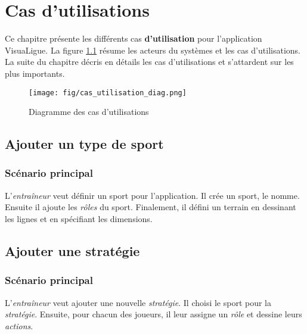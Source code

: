 
\chapter{Cas d'utilisations}
\label{s:cas_utilisation}

Ce chapitre présente les différents cas \textbf{d'utilisation} pour l'application VisuaLigue.
La figure \ref{fig:cas_utilisation_diag} résume les acteurs du systèmes et les cas d'utilisations.
La suite du chapitre décris en détails les cas d'utilisations et s'attardent sur les plus importants.

\begin{figure}[htpb]
    \centering
    \texttt{[image: fig/cas\_utilisation\_diag.png]}
    \caption{Diagramme des cas d'utilisations}
    \label{fig:cas_utilisation_diag}
\end{figure}

\newpage

\section{Ajouter un type de sport}
\label{sec:ajouter_un_type_de_sport}

\subsection{Sc\'enario principal}
\label{sub:sc'enario_principal}

L'\textit{entra\^ineur} veut définir un sport pour l'application.
Il cr\'ee un sport, le nomme.
Ensuite il ajoute les \textit{r\^oles} du sport.
Finalement, il d\'efini un terrain en dessinant les lignes et en sp\'ecifiant les dimensions.

\section{Ajouter une stratégie}
\label{sec:ajouter_une_strategie}

\subsection{Sc\'enario principal}
\label{sub:sc'enario_principal}

L'\textit{entraîneur} veut ajouter une nouvelle \textit{stratégie}.
Il choisi le sport pour la \textit{strat\'egie}.
Ensuite, pour chacun des joueurs, il leur assigne un \textit{r\^ole} et dessine leurs \textit{actions}.

